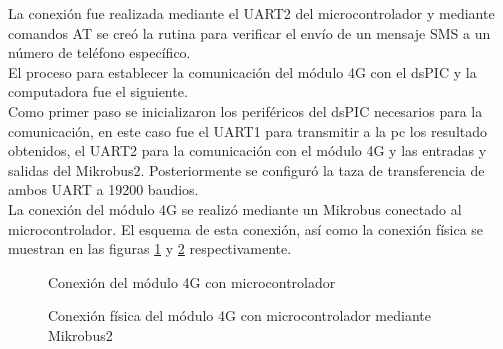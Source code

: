 La conexión fue realizada mediante el UART2 del microcontrolador y mediante comandos AT se creó la rutina para verificar el envío de un mensaje SMS a un número de teléfono específico.\\

El proceso para establecer la comunicación del módulo 4G con el dsPIC y la computadora fue el siguiente.\\

Como primer paso se inicializaron los periféricos del dsPIC necesarios para la comunicación, en este caso fue el UART1 para transmitir a la pc los resultado obtenidos, el UART2 para la comunicación con el módulo 4G y las entradas y salidas del Mikrobus2. Posteriormente se configuró la taza de transferencia de ambos UART a 19200 baudios.\\

La conexión del módulo 4G se realizó mediante un Mikrobus conectado al microcontrolador. El esquema de esta conexión, así como la conexión física se muestran en las figuras \ref{fig:ConexionGSM} y \ref{fig:ConexionFisicaGSM} respectivamente.\\

	\begin{figure}[htbp!]
		\centering
		\caption{Conexión del módulo 4G con microcontrolador}
		\label{fig:ConexionGSM}
	\end{figure}
	
	\begin{figure}[htbp!]
		\centering
		\caption{Conexión física del módulo 4G con microcontrolador mediante Mikrobus2}
		\label{fig:ConexionFisicaGSM}
	\end{figure}
	
